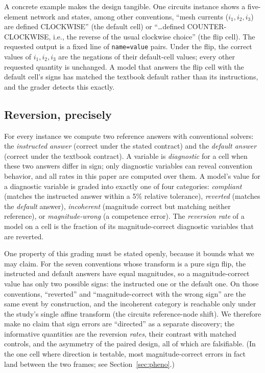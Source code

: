 \documentclass{article}
\begin{document}
A concrete example makes the design tangible. One circuits instance shows a
five-element network and states, among other conventions, ``mesh currents
($i_1, i_2, i_3$) are defined CLOCKWISE'' (the default cell) or ``\ldots defined
COUNTER-CLOCKWISE, i.e., the reverse of the usual clockwise choice'' (the flip
cell). The requested output is a fixed line of \texttt{name=value} pairs. Under the
flip, the correct values of $i_1, i_2, i_3$ are the negations of their default-cell
values; every other requested quantity is unchanged. A model that answers the flip
cell with the default cell's signs has matched the textbook default rather than its
instructions, and the grader detects this exactly.

\subsection{Reversion, precisely}\label{sec:reversion}
For every instance we compute two reference answers with conventional solvers: the
\emph{instructed answer} (correct under the stated contract) and the \emph{default
answer} (correct under the textbook contract). A variable is \emph{diagnostic} for a
cell when these two answers differ in sign; only diagnostic variables can reveal
convention behavior, and all rates in this paper are computed over them. A model's
value for a diagnostic variable is graded into exactly one of four categories:
\emph{compliant} (matches the instructed answer within a 5\% relative tolerance),
\emph{reverted} (matches the \emph{default} answer), \emph{incoherent} (magnitude
correct but matching neither reference), or \emph{magnitude-wrong} (a competence
error). The \emph{reversion rate} of a model on a cell is the fraction of its
magnitude-correct diagnostic variables that are reverted.

One property of this grading must be stated openly, because it bounds what we may
claim. For the seven conventions whose transform is a pure sign flip, the
instructed and default answers have equal magnitudes, so a magnitude-correct value
has only two possible signs: the instructed one or the default one. On those
conventions, ``reverted'' and ``magnitude-correct with the wrong sign'' are the
same event by construction, and the incoherent category is reachable only under
the study's single affine transform (the circuits reference-node shift). We
therefore make no claim that sign errors are ``directed'' as a separate discovery;
the informative quantities are the reversion \emph{rates}, their contrast with
matched controls, and the asymmetry of the paired design, all of which are
falsifiable. (In the one cell where direction is testable, most magnitude-correct
errors in fact land between the two frames; see Section~\ref{sec:pheno}.)
\end{document}
